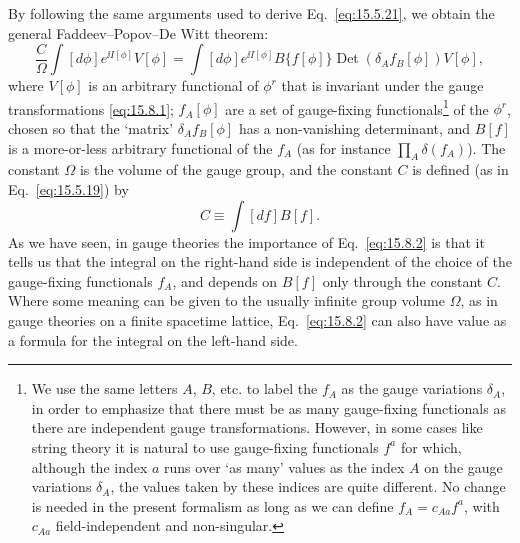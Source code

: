 By following the same arguments used to derive Eq.~\eqref{eq:15.5.21}, we obtain the general Faddeev--Popov--De Witt theorem:
\begin{equation}
 \frac{C}{\Omega}\int[d\phi]e^{\ii I[\phi]}V[\phi]
 =\int[d\phi]e^{\ii I[\phi]}B\{f[\phi]\}\operatorname{Det}(\delta_Af_B[\phi])V[\phi],
 \tag{15.8.2}\label{eq:15.8.2}
\end{equation}
where $V[\phi]$ is an arbitrary functional of $\phi^r$ that is invariant under the gauge transformations \eqref{eq:15.8.1}; $f_A[\phi]$ are a set of gauge-fixing functionals\footnote{We use the same letters $A$, $B$, etc. to label the $f_A$ as the gauge variations $\delta_A$, in order to emphasize that there must be as many gauge-fixing functionals as there are independent gauge transformations. However, in some cases like string theory it is natural to use gauge-fixing functionals $f^a$ for which, although the index $a$ runs over `as many' values as the index $A$ on the gauge variations $\delta_A$, the values taken by these indices are quite different. No change is needed in the present formalism as long as we can define $f_A=c_{Aa}f^a$, with $c_{Aa}$ field-independent and non-singular.} of the $\phi^r$, chosen so that the `matrix' $\delta_Af_B[\phi]$ has a non-vanishing determinant, and $B[f]$ is a more-or-less arbitrary functional of the $f_A$ (as for instance $\prod_A\delta(f_A)$). The constant $\Omega$ is the volume of the gauge group, and the constant $C$ is defined (as in Eq.~\eqref{eq:15.5.19}) by
\begin{equation}
 C\equiv\int[df]B[f].
 \tag{15.8.3}\label{eq:15.8.3}
\end{equation}
As we have seen, in gauge theories the importance of Eq.~\eqref{eq:15.8.2} is that it tells us that the integral on the right-hand side is independent of the choice of the gauge-fixing functionals $f_A$, and depends on $B[f]$ only through the constant $C$. Where some meaning can be given to the usually infinite group volume $\Omega$, as in gauge theories on a finite spacetime lattice, Eq.~\eqref{eq:15.8.2} can also have value as a formula for the integral on the left-hand side.

